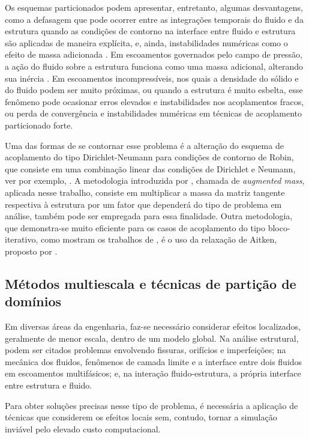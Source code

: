 Os esquemas particionados podem apresentar, entretanto, algumas desvantagens, como a defasagem que pode ocorrer entre as integrações temporais do fluido e da estrutura quando as condições de contorno na interface entre fluido e estrutura são aplicadas de maneira explícita, e, ainda, instabilidades numéricas como o efeito de massa adicionada \cite{FelippaPF:2001}. Em escoamentos governados pelo campo de pressão, a ação do fluido sobre a estrutura funciona como uma massa adicional, alterando sua inércia \cite{TallecM:2001}. Em escoamentos incompressíveis, nos quais a densidade do sólido e do fluido podem ser muito próximas, ou quando a estrutura é muito esbelta, esse fenômeno pode ocasionar erros elevados e instabilidades nos acoplamentos fracos, ou  perda de convergência e instabilidades numéricas em técnicas de acoplamento particionado forte. 

Uma das formas de se contornar esse problema é a alteração do esquema de acoplamento do tipo Dirichlet-Neumann para condições de contorno de Robin, que consiste em uma combinação linear das condições de Dirichlet e Neumann, ver por exemplo, . A metodologia introduzida por , chamada de \textit{augmented mass}, aplicada nesse trabalho, consiste em multiplicar a massa da matriz tangente respectiva à estrutura por um fator que dependerá do tipo de problema em análise, também pode ser empregada para essa finalidade. Outra metodologia, que demonstra-se muito eficiente para os casos de acoplamento do tipo bloco-iterativo, como mostram os trabalhos de \cite{FernandesCS:2019,KuttlerW:2008}, é o uso da relaxação de Aitken, proposto por .

\subsection{Métodos multiescala e técnicas de partição de domínios}
\label{arlequinsection}

Em diversas áreas da engenharia, faz-se necessário considerar efeitos localizados, geralmente de menor escala, dentro de um modelo global. Na análise estrutural, podem ser citados problemas envolvendo fissuras, orifícios e imperfeições; na mecânica dos fluidos, fenômenos de camada limite e a interface entre dois fluidos em escoamentos multifásicos; e, na interação fluido-estrutura, a própria interface entre estrutura e fluido.

Para obter soluções precisas nesse tipo de problema, é necessária a aplicação de técnicas que considerem os efeitos locais sem, contudo, tornar a simulação inviável pelo elevado custo computacional.

